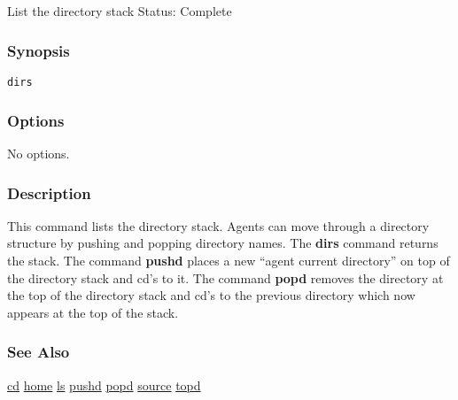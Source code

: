 \subsection{}
\label{dirs}
List the directory stack 
 Status: Complete
\subsubsection*{Synopsis}
\begin{verbatim}
dirs
\end{verbatim}
\subsubsection*{Options}
 No options. 
\subsubsection*{Description}
 This command lists the directory stack. Agents can move through a directory structure by pushing and popping directory names. The \textbf{dirs}
 command returns the stack. 
 The command \textbf{pushd}
 places a new ``agent current directory'' on top of the directory stack and cd's to it. The command \textbf{popd}
 removes the directory at the top of the directory stack and cd's to the previous directory which now appears at the top of the stack. 
\subsubsection*{See Also}
\hyperref[cd]{cd} \hyperref[home]{home} \hyperref[ls]{ls} \hyperref[pushd]{pushd} \hyperref[popd]{popd} \hyperref[source]{source} \hyperref[topd]{topd} 